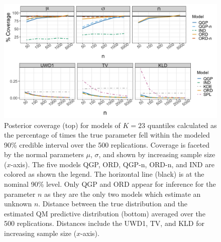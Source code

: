 \documentclass[preprint,12pt,authoryear]{elsarticle}
\newcommand{\1}[1]{\mathds{1}\left[#1\right]}
\begin{document}
\begin{figure}[hbt!]
  \centering
  \includegraphics[width=1\linewidth]{Images/normal_cover_dist.png}
\caption{Posterior coverage (top) for models of $K = 23$ quantiles
calculated as the percentage of times the 
true parameter fell within the modeled 90\% credible interval over the 500 
replications. Coverage is faceted by the normal parameters $\mu$, $\sigma$,
and shown by increasing sample size 
($x$-axis). The five models QGP, ORD, QGP-n, ORD-n, and IND are colored as 
shown the legend. The horizontal line (black) is at the nominal 90\% level. 
Only QGP and ORD appear for inference for the parameter $n$ as they are the 
only two models which 
estimate an unknown $n$.
Distance between the true distribution and the estimated QM predictive 
distribution (bottom) averaged over the 500 replications. Distances include the 
UWD1, TV, and KLD for increasing sample 
size ($x$-axis).}
\label{fig:normal_cov_dists}
\end{figure}
\end{document}
